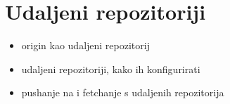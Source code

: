 \chapter*{Udaljeni repozitoriji}

\begin{itemize}
   \item origin kao udaljeni repozitorij
   \item udaljeni repozitoriji, kako ih konfigurirati
   \item pushanje na i fetchanje s udaljenih repozitorija
\end{itemize}


